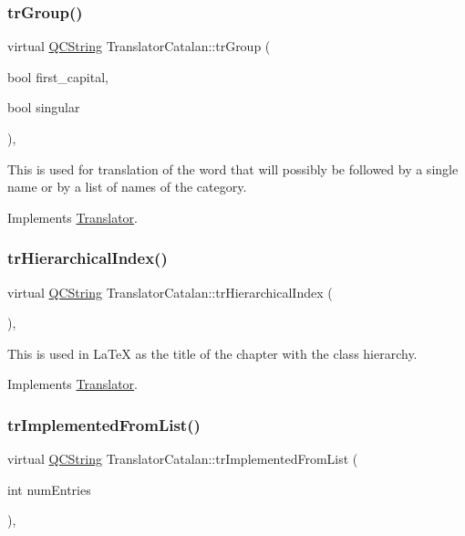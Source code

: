 \subsubsection{\texorpdfstring{trGroup()}{trGroup()}}
{\footnotesize\ttfamily virtual \mbox{\hyperlink{class_q_c_string}{Q\+C\+String}} Translator\+Catalan\+::tr\+Group (\begin{DoxyParamCaption}\item[{bool}]{first\+\_\+capital,  }\item[{bool}]{singular }\end{DoxyParamCaption})\hspace{0.3cm}{\ttfamily [inline]}, {\ttfamily [virtual]}}

This is used for translation of the word that will possibly be followed by a single name or by a list of names of the category. 

Implements \mbox{\hyperlink{class_translator}{Translator}}.

\mbox{\label{class_translator_catalan_ad95163ad8ecc40b1acb5f96a6a041735}} 
\subsubsection{\texorpdfstring{trHierarchicalIndex()}{trHierarchicalIndex()}}
{\footnotesize\ttfamily virtual \mbox{\hyperlink{class_q_c_string}{Q\+C\+String}} Translator\+Catalan\+::tr\+Hierarchical\+Index (\begin{DoxyParamCaption}{ }\end{DoxyParamCaption})\hspace{0.3cm}{\ttfamily [inline]}, {\ttfamily [virtual]}}

This is used in La\+TeX as the title of the chapter with the class hierarchy. 

Implements \mbox{\hyperlink{class_translator}{Translator}}.

\mbox{\label{class_translator_catalan_ac53980db5a49706f05c1b486cfe99acc}} 
\subsubsection{\texorpdfstring{trImplementedFromList()}{trImplementedFromList()}}
{\footnotesize\ttfamily virtual \mbox{\hyperlink{class_q_c_string}{Q\+C\+String}} Translator\+Catalan\+::tr\+Implemented\+From\+List (\begin{DoxyParamCaption}\item[{int}]{num\+Entries }\end{DoxyParamCaption})\hspace{0.3cm}{\ttfamily [inline]}, {\ttfamily [virtual]}}

